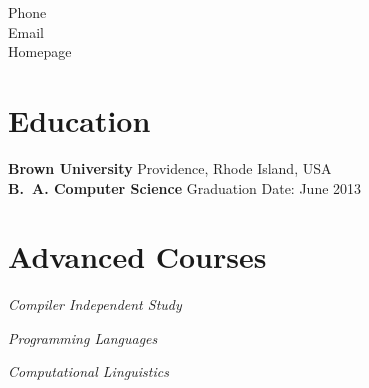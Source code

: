 \documentclass[margin,line]{resume}
\begin{document}
\begin{resume}


    \hfill Phone          \vspace{0mm}\\\vspace{0mm}%
    \hfill Email      \vspace{0mm}\\\vspace{-4.5mm}%
    \hfill Homepage      \vspace{0mm}\\\vspace{-4.5mm}%

    \section{\mysidestyle{} Education}

    \textbf{Brown University}    \hfill Providence, Rhode Island, USA     \vspace{2mm}\\
    \textbf{B.\ A. Computer Science}  \hfill Graduation Date: June 2013 \vspace{-3mm}\\\vspace{-1.5mm}%

    \section{\mysidestyle{} Advanced Courses}

    \textsl{Compiler Independent Study}   \par\vspace{-4mm}%
     {\addtolength{\leftskip}{2 mm} 
      \par}
 
     \textsl{Programming Languages} \par\vspace{-4mm}%
    {\addtolength{\leftskip}{2 mm} 
    \par}
    
    \textsl{Computational Linguistics} \par\vspace{-4mm}%
     {\addtolength{\leftskip}{2 mm} 
         \par}
     

\end{resume}
\end{document}
